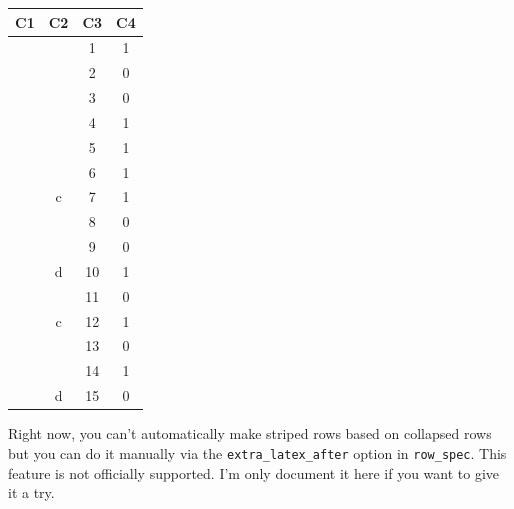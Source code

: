 \documentclass[table]{article}
\begin{document}
\begin{tabular}{>{\bfseries}cccc}
\toprule
C1 & C2 & C3 & C4\\
\midrule
 &  & 1 & 1\\

 &  & 2 & 0\\

 &  & 3 & 0\\

 &  & 4 & 1\\

 &  & 5 & 1\\

 &  & 6 & 1\\

 & \multirow{-7}{*}{\centering\arraybackslash c} & 7 & 1\\

 &  & 8 & 0\\

 &  & 9 & 0\\

\multirow{-10}{*}{\centering\arraybackslash a} & \multirow{-3}{*}{\centering\arraybackslash d} & 10 & 1\\
\cmidrule{1-4}
 &  & 11 & 0\\

 & \multirow{-2}{*}{\centering\arraybackslash c} & 12 & 1\\

 &  & 13 & 0\\

 &  & 14 & 1\\

\multirow{-5}{*}{\centering\arraybackslash b} & \multirow{-3}{*}{\centering\arraybackslash d} & 15 & 0\\
\bottomrule
\end{tabular}

Right now, you can't automatically make striped rows based on collapsed
rows but you can do it manually via the \texttt{extra\_latex\_after}
option in \texttt{row\_spec}. This feature is not officially supported.
I'm only document it here if you want to give it a try.
\end{document}

